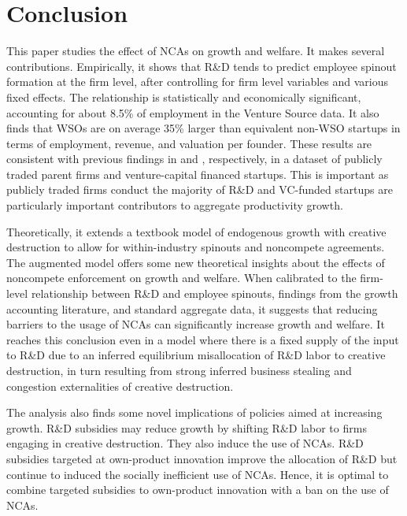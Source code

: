 \documentclass[11pt,english]{article}
\theoremstyle{definition}
\begin{document}
\section{Conclusion}\label{sec:conclusion}
 
This paper studies the effect of NCAs on growth and welfare. It makes several contributions. Empirically, it shows that R\&D tends to predict employee spinout formation at the firm level, after controlling for firm level variables and various fixed effects. The relationship is statistically and economically significant, accounting for about 8.5\% of employment in the Venture Source data. It also finds that WSOs are on average 35\% larger than equivalent non-WSO startups in terms of employment, revenue, and valuation per founder. These results are consistent with previous findings in \cite{babina_entrepreneurial_2019} and \cite{muendler_employee_2012}, respectively, in a dataset of publicly traded parent firms and venture-capital financed startups. This is important as publicly traded firms conduct the majority of R\&D and VC-funded startups are particularly important contributors to aggregate productivity growth. 

Theoretically, it extends a textbook model of endogenous growth with creative destruction to allow for within-industry spinouts and noncompete agreements. The augmented model offers some new theoretical insights about the effects of noncompete enforcement on growth and welfare. When calibrated to the firm-level relationship between R\&D and employee spinouts, findings from the growth accounting literature, and standard aggregate data, it suggests that reducing barriers to the usage of NCAs can significantly increase growth and welfare. It reaches this conclusion even in a model where there is a fixed supply of the input to R\&D due to an inferred equilibrium misallocation of R\&D labor to creative destruction, in turn resulting from strong inferred business stealing and congestion externalities of creative destruction.

The analysis also finds some novel implications of policies aimed at increasing growth. R\&D subsidies may reduce growth by shifting R\&D labor to firms engaging in creative destruction. They also induce the use of NCAs. R\&D subsidies targeted at own-product innovation improve the allocation of R\&D but continue to induced the socially inefficient use of NCAs. Hence, it is optimal to combine targeted subsidies to own-product innovation with a ban on the use of NCAs. 
\end{document}
